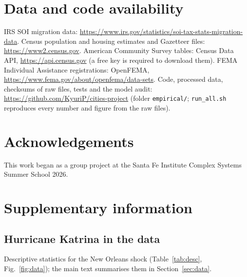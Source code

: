 \documentclass[11pt]{article}
\begin{document}
\section*{Data and code availability}\label{sec:availability}
IRS SOI migration data: \url{https://www.irs.gov/statistics/soi-tax-stats-migration-data}. Census population and housing estimates and Gazetteer files: \url{https://www2.census.gov}. American Community Survey tables: Census Data API, \url{https://api.census.gov} (a free key is required to download them). FEMA Individual Assistance registrations: OpenFEMA, \url{https://www.fema.gov/about/openfema/data-sets}. Code, processed data, checksums of raw files, tests and the model audit: \url{https://github.com/KyuriP/cities-project} (folder \texttt{empirical/}; \texttt{run\_all.sh} reproduces every number and figure from the raw files).

\section*{Acknowledgements}
This work began as a group project at the Santa Fe Institute Complex Systems Summer School 2026.






\clearpage
\appendix
\renewcommand{\thetable}{S\arabic{table}}
\renewcommand{\thefigure}{S\arabic{figure}}
\renewcommand{\thesubsection}{S\arabic{subsection}}
\setcounter{table}{0}
\setcounter{figure}{0}
\setcounter{subsection}{0}
\section*{Supplementary information}
\subsection{Hurricane Katrina in the data}\label{si:data}
Descriptive statistics for the New Orleans shock (Table~\ref{tab:desc}, Fig.~\ref{fig:data}); the main text summarises them in Section~\ref{sec:data}.
\end{document}
